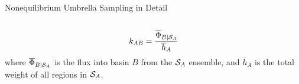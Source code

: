 \documentclass[final]{beamer}
\begin{document}
\begin{columns}[t]
\begin{column}{.32 \linewidth}
\begin{block}{\Large Nonequilibrium Umbrella Sampling in Detail}
\begin{columns}[t]
\begin{column}{.50\linewidth}
                    \begin{equation*} \label{eq:rate}
                        k_{AB} = \frac{\overline{\Phi}_{B \mid {\cal S}_A}}{\overline{h}_A}
                    \end{equation*}
                    where $\overline{\Phi}_{B \mid {\cal S}_A}$ is the flux into basin $B$ from the ${\cal S}_A$ ensemble, and $\overline{h}_A$ is the total weight of all regions in ${\cal S}_A$.
                \end{column}
            \end{columns}


\end{block}
\end{column}
\end{columns}
\end{document}

